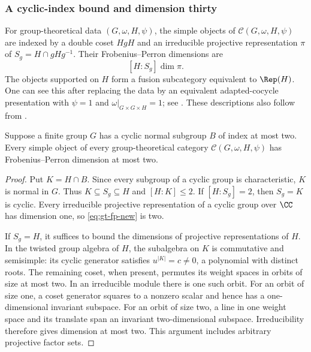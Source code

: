 \subsubsection{A cyclic-index bound and dimension thirty}
For group-theoretical data $(G,\omega,H,\psi)$, the simple objects of
$\mathcal C(G,\omega,H,\psi)$ are indexed by a double coset $HgH$ and
an irreducible projective representation $\pi$ of
$S_g=H\cap gHg^{-1}$. Their Frobenius--Perron dimensions are
\begin{equation}\label{eq:gt-fp-new}
 [H:S_g]\dim\pi.
\end{equation}
The objects supported on $H$ form a fusion subcategory equivalent to
$\Rep(H)$. One can see this after replacing the data by an equivalent
adapted-cocycle presentation with $\psi=1$ and
$\omega|_{G\times G\times H}=1$; see
\cite[Proposition~2.5]{SchGT}. These descriptions also follow from
\cite{GNgt}.

\begin{lemma}\label{lem:cyclic-index}
Suppose a finite group $G$ has a cyclic normal subgroup $B$ of index at
most two. Every simple object of every group-theoretical category
$\mathcal C(G,\omega,H,\psi)$ has Frobenius--Perron dimension at most two.
\end{lemma}
\begin{proof}
Put $K=H\cap B$. Since every subgroup of a cyclic group is characteristic,
$K$ is normal in $G$. Thus $K\subseteq S_g\subseteq H$ and
$[H:K]\leq2$. If $[H:S_g]=2$, then $S_g=K$ is cyclic. Every irreducible
projective representation of a cyclic group over $\CC$ has dimension one,
so \eqref{eq:gt-fp-new} is two.

If $S_g=H$, it suffices to bound the dimensions of projective
representations of $H$. In the twisted group algebra of $H$, the
subalgebra on $K$ is commutative and semisimple: its cyclic generator
satisfies $u^{|K|}=c\ne0$, a polynomial with distinct roots. The remaining
coset, when present, permutes its weight spaces in orbits of size at most
two. In an irreducible module there is one such orbit. For an orbit of
size one, a coset generator squares to a nonzero scalar and hence has a
one-dimensional invariant subspace. For an orbit of size two, a line in
one weight space and its translate span an invariant two-dimensional
subspace. Irreducibility therefore gives dimension at most two. This
argument includes arbitrary projective factor sets.
\end{proof}


